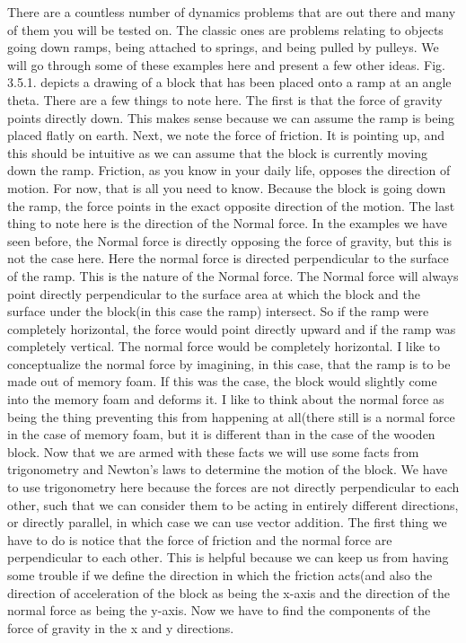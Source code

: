\documentclass{article}[gray]
\numberwithin{equation}{subsection}
\begin{document}
There are a countless number of dynamics problems that are out there and many of them you will be tested on. The classic ones are problems relating to objects going down ramps, being attached to springs, and being pulled by pulleys. We will go through some of these examples here and present a few other ideas. Fig. 3.5.1. depicts a drawing of a block that has been placed onto a ramp at an angle theta. There are a few things to note here. The first is that the force of gravity points directly down. This makes sense because we can assume the ramp is being placed flatly on earth. Next, we note the force of friction. It is pointing up, and this should be intuitive as we can assume that the block is currently moving down the ramp. Friction, as you know in your daily life, opposes the direction of motion. For now, that is all you need to know. Because the block is going down the ramp, the force points in the exact opposite direction of the motion. The last thing to note here is the direction of the Normal force. In the examples we have seen before, the Normal force is directly opposing the force of gravity, but this is not the case here. Here the normal force is directed perpendicular to the surface of the ramp. This is the nature of the Normal force. The Normal force will always point directly perpendicular to the surface area at which the block and the surface under the block(in this case the ramp) intersect. So if the ramp were completely horizontal, the force would point directly upward and if the ramp was completely vertical. The normal force would be completely horizontal. I like to conceptualize the normal force by imagining, in this case, that the ramp is to be made out of memory foam. If this was the case, the block would slightly come into the memory foam and deforms it. I like to think about the normal force as being the thing preventing this from happening at all(there still is a normal force in the case of memory foam, but it is different than in the case of the wooden block. Now that we are armed with these facts we will use some facts from trigonometry and Newton's laws to determine the motion of the block. We have to use trigonometry here because the forces are not directly perpendicular to each other, such that we can consider them to be acting in entirely different directions, or directly parallel, in which case we can use vector addition. The first thing we have to do is notice that the force of friction and the normal force are perpendicular to each other. This is helpful because we can keep us from having some trouble if we define the direction in which the friction acts(and also the direction of acceleration of the block as being the x-axis and the direction of the normal force as being the y-axis. Now we have to find the components of the force of gravity in the x and y directions. 
\end{document}
